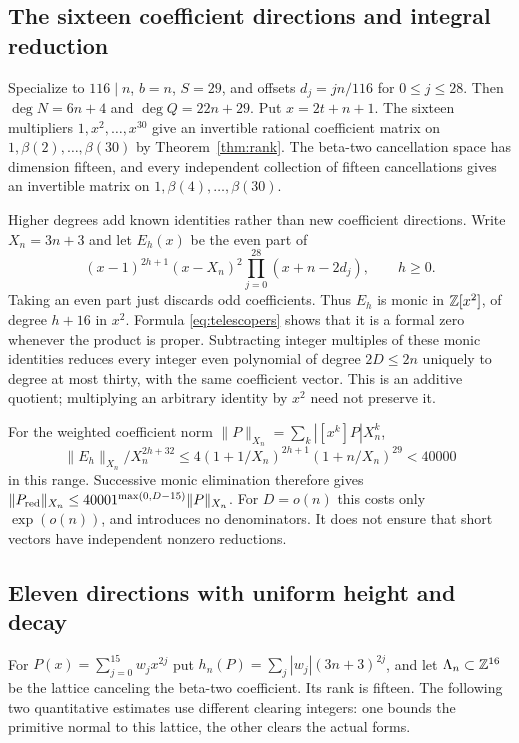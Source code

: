 \subsection{The sixteen coefficient directions and integral reduction}
Specialize to $116\mid n$, $b=n$, $S=29$, and offsets
$d_j=jn/116$ for $0\leq j\leq28$. Then $\deg N=6n+4$ and
$\deg Q=22n+29$. Put $x=2t+n+1$. The sixteen multipliers
$1,x^2,\ldots,x^{30}$ give an invertible rational coefficient matrix
on $1,\beta(2),\ldots,\beta(30)$ by Theorem~\ref{thm:rank}.
The beta-two cancellation space has dimension fifteen, and every
independent collection of fifteen cancellations gives an invertible
matrix on $1,\beta(4),\ldots,\beta(30)$.

Higher degrees add known identities rather than new coefficient
directions. Write $X_n=3n+3$ and let $E_h(x)$ be the even part of
\[
 (x-1)^{2h+1}(x-X_n)^2\prod_{j=0}^{28}(x+n-2d_j),\qquad h\geq0.
\]
Taking an even part just discards odd coefficients. Thus $E_h$ is
monic in $\mathbb Z[x^2]$, of degree $h+16$ in $x^2$. Formula
\eqref{eq:telescopers} shows that it is a formal zero whenever the
product is proper. Subtracting integer multiples of these monic
identities reduces every integer even polynomial of degree $2D\leq2n$
uniquely to degree at most thirty, with the same coefficient vector.
This is an additive quotient; multiplying an arbitrary identity by
$x^2$ need not preserve it.

For the weighted coefficient norm $\|P\|_{X_n}=\sum_k|[x^k]P|X_n^k$,
\[
 \|E_h\|_{X_n}/X_n^{2h+32}
 \leq4(1+1/X_n)^{2h+1}(1+n/X_n)^{29}<40000
\]
in this range. Successive monic elimination therefore gives
$\|P_{\rm red}\|_{X_n}\leq40001^{\max(0,D-15)}\|P\|_{X_n}$.
For $D=o(n)$ this costs only $\exp(o(n))$, and introduces no
denominators. It does not ensure that short vectors have independent
nonzero reductions.

\subsection{Eleven directions with uniform height and decay}
For $P(x)=\sum_{j=0}^{15}w_jx^{2j}$ put
$h_n(P)=\sum_j|w_j|(3n+3)^{2j}$, and let $\Lambda_n\subset\mathbb Z^{16}$
be the lattice canceling the beta-two coefficient. Its rank is fifteen.
The following two quantitative estimates use different clearing integers:
one bounds the primitive normal to this lattice, the other clears
the actual forms.

